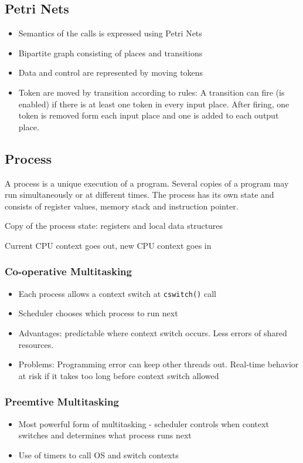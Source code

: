 \subsection{Petri Nets}
\begin{itemize}[noitemsep]
\item Semantics of the calls is expressed using Petri Nets
\item Bipartite graph consisting of places and transitions
\item Data and control are represented by moving tokens
\item Token are moved by transition according to rules: A transition can fire (is enabled) if there is at least one token in every input place. After firing, one token is removed form each input place and one is added to each output place.
\end{itemize}

\subsection{Process}

\begin{definition}[Process]
A process is a unique execution of a program. Several copies of a program may run simultaneously or at different times. The process has its own state and consists of register values, memory stack and instruction pointer.
\end{definition}

\begin{definition}
Copy of the process state: registers and local data structures
\end{definition}

\begin{definition}
Current CPU context goes out, new CPU context goes in
\end{definition}

\subsubsection{Co-operative Multitasking}

\begin{itemize}[noitemsep]
\item Each process allows a context switch at \texttt{cswitch()} call
\item Scheduler chooses which process to run next
\item Advantages: predictable where context switch occurs. Less errors of shared resources. 
\item Problems: Programming error can keep other threads out. Real-time behavior at risk if it takes too long before context switch allowed
\end{itemize}


\subsubsection{Preemtive Multitasking}
\begin{itemize}[noitemsep]
\item Most powerful form of multitasking - scheduler controls when context switches and determines what process runs next
\item Use of timers to call OS and switch contexts
\end{itemize}


\cleardoublepage